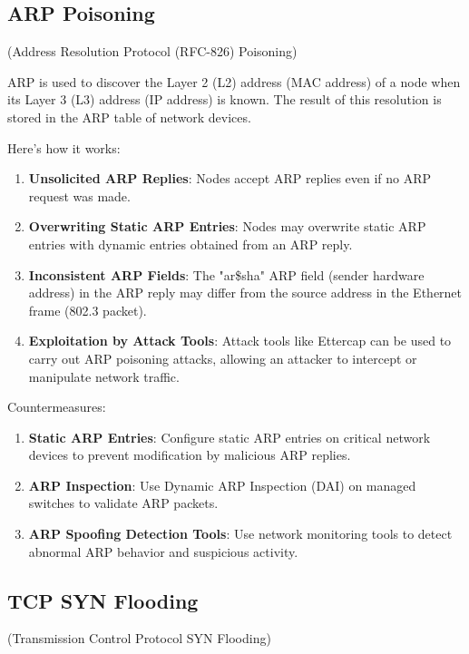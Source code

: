 \begin{center}
    \section{ARP Poisoning}
    (Address Resolution Protocol (RFC-826) Poisoning)
\end{center}

ARP is used to discover the Layer 2 (L2) address (MAC address) of a node when its Layer 3 (L3) address (IP address) is known. The result of this resolution is stored in the ARP table of network devices.

Here's how it works:
\begin{enumerate}
    \item \textbf{Unsolicited ARP Replies}: Nodes accept ARP replies even if no ARP request was made.
    \item \textbf{Overwriting Static ARP Entries}: Nodes may overwrite static ARP entries with dynamic entries obtained from an ARP reply.
    \item \textbf{Inconsistent ARP Fields}: The "ar\$sha" ARP field (sender hardware address) in the ARP reply may differ from the source address in the Ethernet frame (802.3 packet).
    \item \textbf{Exploitation by Attack Tools}: Attack tools like Ettercap can be used to carry out ARP poisoning attacks, allowing an attacker to intercept or manipulate network traffic.
\end{enumerate}

Countermeasures:
\begin{enumerate}
    \item \textbf{Static ARP Entries}: Configure static ARP entries on critical network devices to prevent modification by malicious ARP replies.
    \item \textbf{ARP Inspection}: Use Dynamic ARP Inspection (DAI) on managed switches to validate ARP packets.
    \item \textbf{ARP Spoofing Detection Tools}: Use network monitoring tools to detect abnormal ARP behavior and suspicious activity.
\end{enumerate}


\begin{center}
    \section{TCP SYN Flooding}
    (Transmission Control Protocol SYN Flooding)
\end{center}


